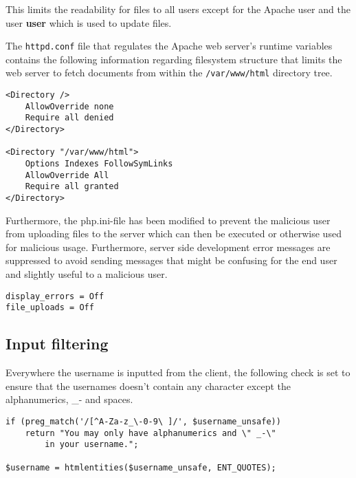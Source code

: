 \documentclass[a4paper]{scrartcl}
\begin{document}
This limits the readability for files to all users except for the Apache user and the user \textbf{user} which is used to update files.

The \texttt{httpd.conf} file that regulates the Apache web server's runtime variables contains the following information regarding filesystem structure that limits the web server to fetch documents from within the \texttt{/var/www/html} directory tree.

\begin{lstlisting}
<Directory />
    AllowOverride none
    Require all denied
</Directory>

<Directory "/var/www/html">
    Options Indexes FollowSymLinks
    AllowOverride All 
    Require all granted
</Directory>

\end{lstlisting}

Furthermore, the php.ini-file has been modified to prevent the malicious user from uploading files to the server which can then be executed or otherwise used for malicious usage. Furthermore, server side development error messages are suppressed to avoid sending messages that might be confusing for the end user and slightly useful to a malicious user.

\begin{lstlisting}
display_errors = Off
file_uploads = Off
\end{lstlisting}

\subsection{Input filtering}
\label{subsec:input_filtering_result}

Everywhere the username is inputted from the client, the following check is set to ensure that the usernames doesn't contain any character except the alphanumerics, \_- and spaces.

\begin{lstlisting}                                                                                
if (preg_match('/[^A-Za-z_\-0-9\ ]/', $username_unsafe))               
	return "You may only have alphanumerics and \" _-\"                
		in your username.";                                            
             
$username = htmlentities($username_unsafe, ENT_QUOTES);
\end{lstlisting}
\end{document}
